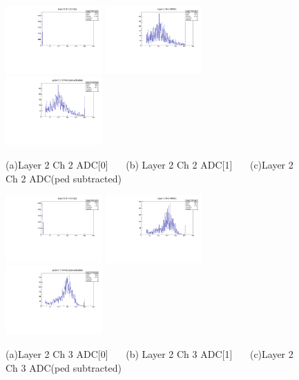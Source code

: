 \documentclass[a4paper,11pt]{article}
\theoremstyle{mytheor}
\begin{document}
\begin{figure}[H] 
\vspace*{-0.3cm} 
\includegraphics[width=0.33\textwidth,scale=0.5,trim=0 0 0 0,clip]{plotsdir/file0_muons-Layer2_Ch2_adc0-1.pdf} 
\includegraphics[width=0.33\textwidth,scale=0.5,trim=0 0 0 0,clip]{plotsdir/file0_muons-Layer2_Ch2_adc1-1.pdf} 
\includegraphics[width=0.33\textwidth,scale=0.5,trim=0 0 0 0,clip]{plotsdir/file0_muons-Layer2_Ch2_adcPedsub-1.pdf} 
\caption{(a)Layer 2 Ch 2 ADC[0] ~~~(b) Layer 2 Ch 2 ADC[1] ~~~(c)Layer 2 Ch 2 ADC(ped subtracted) } 
\end{figure} 
\clearpage 
\begin{figure}[H] 
\vspace*{-0.3cm} 
\includegraphics[width=0.33\textwidth,scale=0.5,trim=0 0 0 0,clip]{plotsdir/file0_muons-Layer2_Ch3_adc0-1.pdf} 
\includegraphics[width=0.33\textwidth,scale=0.5,trim=0 0 0 0,clip]{plotsdir/file0_muons-Layer2_Ch3_adc1-1.pdf} 
\includegraphics[width=0.33\textwidth,scale=0.5,trim=0 0 0 0,clip]{plotsdir/file0_muons-Layer2_Ch3_adcPedsub-1.pdf} 
\caption{(a)Layer 2 Ch 3 ADC[0] ~~~(b) Layer 2 Ch 3 ADC[1] ~~~(c)Layer 2 Ch 3 ADC(ped subtracted) } 
\end{figure} 
\end{document}
